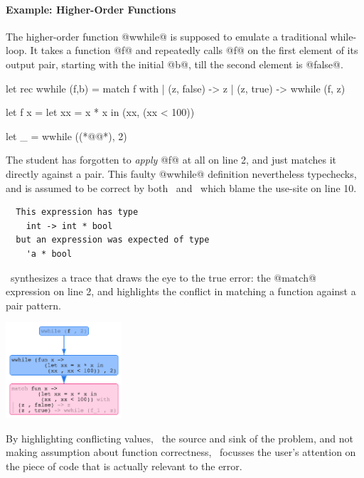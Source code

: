 \paragraph{Example: Higher-Order Functions}
%
The higher-order function @wwhile@ is supposed
to emulate a traditional while-loop. It takes
a function @f@ and repeatedly calls @f@ on the
first element of its output pair, starting with
the initial @b@, till the second element is @false@.
%
\begin{ecode}
  let rec wwhile (f,b) =
    match f with
    | (z, false) -> z
    | (z, true)  -> wwhile (f, z)

  let f x =
    let xx = x * x in
    (xx, (xx < 100))

  let _ = wwhile ((*@@*), 2)
\end{ecode}
%
The student has forgotten to \emph{apply} @f@ at all on line 2,
and just matches it directly against a pair.
This faulty @wwhile@ definition nevertheless typechecks,
and is assumed to be correct by both \ocaml\ and \sherrloc\
which blame the use-site on line 10.
%
\begin{verbatim}
  This expression has type
    int -> int * bool
  but an expression was expected of type
    'a * bool
\end{verbatim}
%
\toolname\ synthesizes a trace that draws the eye to the
true error: the @match@ expression on line 2, and highlights
the conflict in matching a function against a pair pattern.
%
\begin{center}
  \includegraphics[height=135px]{nanomaly/wwhile.png}
\end{center}
%
By highlighting conflicting values, \ie\ the source and sink
of the problem, and not making assumption about function correctness, \toolname\
focusses the user's attention on the piece of code that is
actually relevant to the error.

